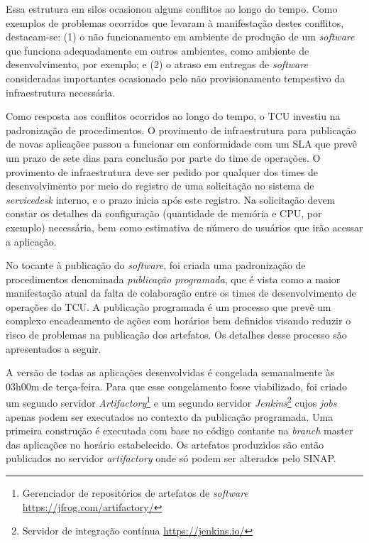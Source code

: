 Essa estrutura em silos ocasionou alguns conflitos ao longo do tempo. Como
exemplos de problemas ocorridos que levaram à manifestação
destes conflitos, destacam-se: (1) o não funcionamento em ambiente de produção
de um \textit{software} que funciona adequadamente
em outros ambientes, como ambiente de desenvolvimento, por exemplo; e (2) o
atraso em entregas de \textit{software} consideradas importantes ocasionado
pelo não provisionamento tempestivo da infraestrutura necessária.

Como resposta aos conflitos ocorridos ao longo do tempo, o \acrshort{TCU}
investiu na padronização de procedimentos. O provimento de infraestrutura
para publicação de novas aplicações passou a funcionar em conformidade com um
\acrfull{SLA} que prevê um prazo de sete dias para conclusão por parte do time
de operações. O provimento de infraestrutura deve ser pedido por qualquer
dos times de desenvolvimento por meio do registro de uma solicitação no sistema
de \textit{servicedesk} interno, e o prazo inicia após este registro.
Na solicitação devem constar os detalhes da configuração (quantidade de memória
e CPU, por exemplo) necessária, bem como estimativa de número de usuários que
irão acessar a aplicação.

No tocante à publicação do \textit{software}, foi criada uma padronização de
procedimentos denominada \emph{publicação programada}, que é vista como a maior
manifestação atual da falta de colaboração entre os times de desenvolvimento
de operações do \acrshort{TCU}. A publicação programada
é um processo que prevê um complexo encadeamento de ações com horários bem
definidos visando reduzir o risco de problemas na publicação dos artefatos. Os
detalhes desse processo são apresentados a seguir.

A versão de todas as aplicações desenvolvidas é congelada semanalmente
às 03h00m de terça-feira. Para que esse congelamento fosse viabilizado, foi
criado um segundo servidor \textit{Artifactory}\footnote{Gerenciador de
repositórios de artefatos de \textit{software} \url{https://jfrog.com/artifactory/}}
e um segundo servidor \textit{Jenkins}\footnote{Servidor de integração contínua
\url{https://jenkins.io/}}
cujos \textit{jobs} apenas podem ser executados no
contexto da publicação programada. Uma primeira construção é executada com
base no código contante na \textit{branch} master das aplicações no horário
estabelecido. Os artefatos produzidos são então publicados no servidor
\textit{artifactory} onde só podem ser alterados pelo \acrshort{SINAP}.

